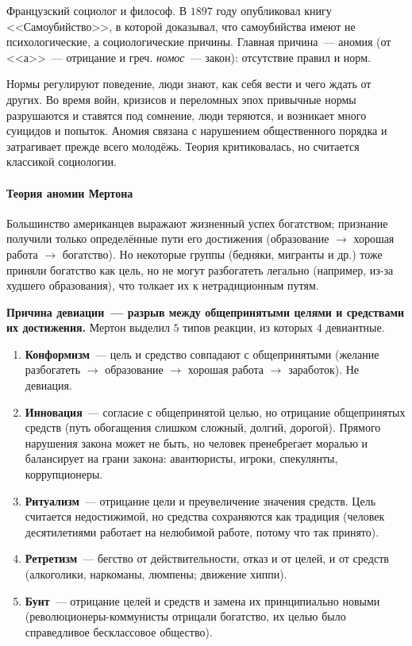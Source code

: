 \documentclass[12pt]{article}
\begin{document}
	\begin{person}
		Французский социолог и философ. В $1897$ году опубликовал книгу <<Самоубийство>>, в которой доказывал, что самоубийства имеют не психологические, а социологические причины. Главная причина~--- аномия (от <<а>>~--- отрицание и греч. \textit{номос}~--- закон): отсутствие правил и норм.

		Нормы регулируют поведение, люди знают, как себя вести и чего ждать от других. Во время войн, кризисов и переломных эпох привычные нормы разрушаются и ставятся под сомнение, люди теряются, и возникает много суицидов и попыток. Аномия связана с нарушением общественного порядка и затрагивает прежде всего молодёжь. Теория критиковалась, но считается классикой социологии.
	\end{person}

	\paragraph{Теория аномии Мертона}

	\begin{person}
		Большинство американцев выражают жизненный успех богатством; признание получили только определённые пути его достижения (образование $\to$ хорошая работа $\to$ богатство). Но некоторые группы (бедняки, мигранты и др.) тоже приняли богатство как цель, но не могут разбогатеть легально (например, из-за худшего образования), что толкает их к нетрадиционным путям.

		\textbf{Причина девиации~--- разрыв между общепринятыми целями и средствами их достижения.} Мертон выделил $5$ типов реакции, из которых $4$ девиантные.
	\end{person}

	\begin{enumerate}
		\item \textbf{Конформизм}~--- цель и средство совпадают с общепринятыми (желание разбогатеть $\to$ образование $\to$ хорошая работа $\to$ заработок). Не девиация.
		\item \textbf{Инновация}~--- согласие с общепринятой целью, но отрицание общепринятых средств (путь обогащения слишком сложный, долгий, дорогой). Прямого нарушения закона может не быть, но человек пренебрегает моралью и балансирует на грани закона: авантюристы, игроки, спекулянты, коррупционеры.
		\item \textbf{Ритуализм}~--- отрицание цели и преувеличение значения средств. Цель считается недостижимой, но средства сохраняются как традиция (человек десятилетиями работает на нелюбимой работе, потому что так принято).
		\item \textbf{Ретретизм}~--- бегство от действительности, отказ и от целей, и от средств (алкоголики, наркоманы, люмпены; движение хиппи).
		\item \textbf{Бунт}~--- отрицание целей и средств и замена их принципиально новыми (революционеры-коммунисты отрицали богатство, их целью было справедливое бесклассовое общество).
	\end{enumerate}
\end{document}
